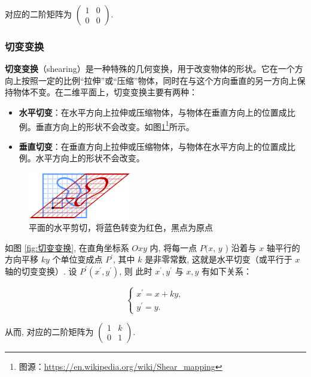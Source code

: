 对应的二阶矩阵为 $\left(\begin{array}{ll}1 & 0 \\ 0 & 0\end{array}\right)$.

\subsubsection{切变变换}
\label{subsubsec:切变变换}

\textcolor{third}{\bf 切变变换}（shearing）是一种特殊的几何变换，用于改变物体的形状。它在一个方向上按照一定的比例“拉伸”或“压缩”物体，同时在与这个方向垂直的另一方向上保持物体不变。在二维平面上，切变变换主要有两种：

\begin{itemize}
    \item \textbf{水平切变}：在水平方向上拉伸或压缩物体，与物体在垂直方向上的位置成比例。垂直方向上的形状不会改变。如图\ref{fig:shearing-wiki}\footnote{图源：\url{https://en.wikipedia.org/wiki/Shear\_mapping}}所示。
    \item \textbf{垂直切变}：在垂直方向上拉伸或压缩物体，与物体在水平方向上的位置成比例。水平方向上的形状不会改变。
\end{itemize}


\begin{figure}[!h]
    \centering
    \includegraphics[width=0.4\textwidth]{figure/matrix/shearing.png}
    \caption{平面的水平剪切，将蓝色转变为红色，黑点为原点}
    \label{fig:shearing-wiki}
\end{figure}


如图 \ref{fig:切变变换}, 在直角坐标系 $O x y$ 内, 将每一点 $P(x$, $y$ ) 沿着与 $x$ 轴平行的方向平移 $k y$ 个单位变成点 $P^{\prime}$, 其中 $k$ 是非零常数, 这就是水平切变（或平行于 $x$ 轴的切变变换）.
设 $P^{\prime}\left(x^{\prime}, y^{\prime}\right)$, 则
此时 $x^{\prime}, y^{\prime}$ 与 $x, y$ 有如下关系：

$$
\left\{\begin{array}{c}
x^{\prime}=x+k y, \\
y^{\prime}=y .
\end{array}\right.
$$

从而, 对应的二阶矩阵为 $\left(\begin{array}{ll}1 & k \\ 0 & 1\end{array}\right)$.

